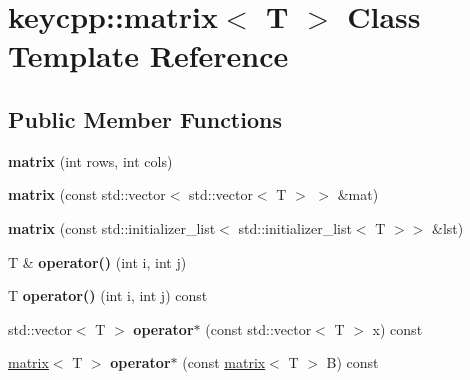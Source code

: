 \hypertarget{classkeycpp_1_1matrix}{\section{keycpp\-:\-:matrix$<$ T $>$ Class Template Reference}
\label{classkeycpp_1_1matrix}
}
\subsection*{Public Member Functions}
\begin{DoxyCompactItemize}
\item 
\hypertarget{classkeycpp_1_1matrix_accfc7cf9173d98b383c57af63f669b94}{{\bfseries matrix} (int rows, int cols)}\label{classkeycpp_1_1matrix_accfc7cf9173d98b383c57af63f669b94}

\item 
\hypertarget{classkeycpp_1_1matrix_a6c3675645b2f1ffc756bd908f090aa5a}{{\bfseries matrix} (const std\-::vector$<$ std\-::vector$<$ T $>$ $>$ \&mat)}\label{classkeycpp_1_1matrix_a6c3675645b2f1ffc756bd908f090aa5a}

\item 
\hypertarget{classkeycpp_1_1matrix_ad8797411bc30cc0d42e0e9b8bcc899d7}{{\bfseries matrix} (const std\-::initializer\-\_\-list$<$ std\-::initializer\-\_\-list$<$ T $>$$>$ \&lst)}\label{classkeycpp_1_1matrix_ad8797411bc30cc0d42e0e9b8bcc899d7}

\item 
\hypertarget{classkeycpp_1_1matrix_a802052b0519a3b20d5a38f84a6832a79}{T \& {\bfseries operator()} (int i, int j)}\label{classkeycpp_1_1matrix_a802052b0519a3b20d5a38f84a6832a79}

\item 
\hypertarget{classkeycpp_1_1matrix_a951ea6752f4fb04e275a04be3539420a}{T {\bfseries operator()} (int i, int j) const }\label{classkeycpp_1_1matrix_a951ea6752f4fb04e275a04be3539420a}

\item 
\hypertarget{classkeycpp_1_1matrix_a78ad6107ab3b9546b20021274fe0ab47}{std\-::vector$<$ T $>$ {\bfseries operator$\ast$} (const std\-::vector$<$ T $>$ x) const }\label{classkeycpp_1_1matrix_a78ad6107ab3b9546b20021274fe0ab47}

\item 
\hypertarget{classkeycpp_1_1matrix_aa5a29b33cfa0d9568b90726fdef372f9}{\hyperlink{classkeycpp_1_1matrix}{matrix}$<$ T $>$ {\bfseries operator$\ast$} (const \hyperlink{classkeycpp_1_1matrix}{matrix}$<$ T $>$ B) const }\label{classkeycpp_1_1matrix_aa5a29b33cfa0d9568b90726fdef372f9}


\end{DoxyCompactItemize}

